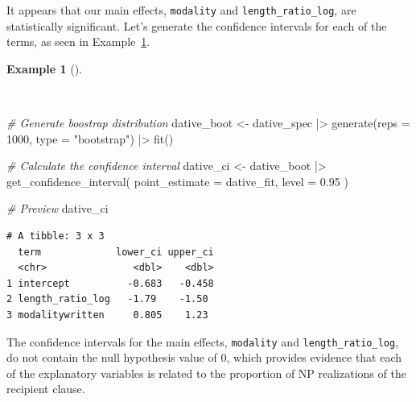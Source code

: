 \documentclass[
  letterpaper,
]{latex/krantz}
\newenvironment{Shaded}{\begin{snugshade}}{\end{snugshade}}
\newcommand{\AttributeTok}[1]{\textcolor[rgb]{0.00,0.00,0.00}{#1}}
\newcommand{\CommentTok}[1]{\textcolor[rgb]{0.00,0.00,0.00}{\textit{#1}}}
\newcommand{\DecValTok}[1]{\textcolor[rgb]{0.00,0.00,0.00}{#1}}
\newcommand{\FloatTok}[1]{\textcolor[rgb]{0.00,0.00,0.00}{#1}}
\newcommand{\FunctionTok}[1]{\textcolor[rgb]{0.00,0.00,0.00}{#1}}
\newcommand{\NormalTok}[1]{\textcolor[rgb]{0.00,0.00,0.00}{#1}}
\newcommand{\OtherTok}[1]{\textcolor[rgb]{0.00,0.00,0.00}{#1}}
\newcommand{\SpecialCharTok}[1]{\textcolor[rgb]{0.00,0.00,0.00}{#1}}
\newcommand{\StringTok}[1]{\textcolor[rgb]{0.00,0.00,0.00}{#1}}
\theoremstyle{definition}
\newtheorem{example}{Example}[chapter]
\theoremstyle{remark}
\begin{document}
It appears that our main effects, \texttt{modality} and
\texttt{length\_ratio\_log}, are statistically significant. Let's
generate the confidence intervals for each of the terms, as seen in
Example~\ref{exm-infer-cat-confidence-interval-logistic-regression}.

\begin{example}[]\protect\hypertarget{exm-infer-cat-confidence-interval-logistic-regression}{}\label{exm-infer-cat-confidence-interval-logistic-regression}

~

\begin{Shaded}
\begin{Highlighting}[]
\CommentTok{\# Generate boostrap distribution}
\NormalTok{dative\_boot }\OtherTok{\textless{}{-}}
\NormalTok{  dative\_spec }\SpecialCharTok{|\textgreater{}}
  \FunctionTok{generate}\NormalTok{(}\AttributeTok{reps =} \DecValTok{1000}\NormalTok{, }\AttributeTok{type =} \StringTok{"bootstrap"}\NormalTok{) }\SpecialCharTok{|\textgreater{}}
  \FunctionTok{fit}\NormalTok{()}

\CommentTok{\# Calculate the confidence interval}
\NormalTok{dative\_ci }\OtherTok{\textless{}{-}}
\NormalTok{  dative\_boot }\SpecialCharTok{|\textgreater{}}
  \FunctionTok{get\_confidence\_interval}\NormalTok{(}
    \AttributeTok{point\_estimate =}\NormalTok{ dative\_fit,}
    \AttributeTok{level =} \FloatTok{0.95}
\NormalTok{  )}

\CommentTok{\# Preview}
\NormalTok{dative\_ci}
\end{Highlighting}
\end{Shaded}

\begin{verbatim}
# A tibble: 3 x 3
  term             lower_ci upper_ci
  <chr>               <dbl>    <dbl>
1 intercept          -0.683   -0.458
2 length_ratio_log   -1.79    -1.50 
3 modalitywritten     0.805    1.23 
\end{verbatim}

\end{example}

The confidence intervals for the main effects, \texttt{modality} and
\texttt{length\_ratio\_log}, do not contain the null hypothesis value of
0, which provides evidence that each of the explanatory variables is
related to the proportion of NP realizations of the recipient clause.
\end{document}
